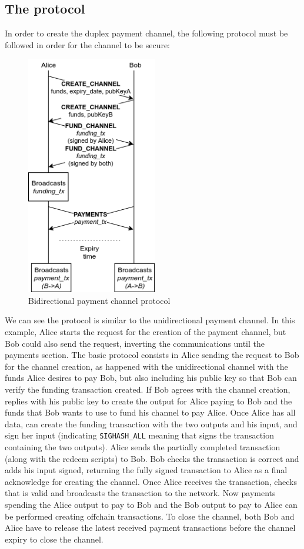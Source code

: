\documentclass[12pt,journal,compsoc]{IEEEtran}
\newcommand{\code}[1]{\texttt{#1}}
\begin{document}
\subsection{The protocol}
In order to create the duplex payment channel, the following protocol must be followed in order for the channel to be secure:
\begin{figure}[h]
    \begin{center}
        \includegraphics[height=10.5cm]{bidir-pc}
        \caption{Bidirectional payment channel protocol}
    \end{center}
\end{figure}
We can see the protocol is similar to the unidirectional payment channel. In this example, Alice starts the request for the creation of the payment channel, but Bob could also send the request, inverting the communications until the payments section. The basic protocol consists in Alice sending the request to Bob for the channel creation, as happened with the unidirectional channel with the funds Alice desires to pay Bob, but also including his public key so that Bob can verify the funding transaction created. If Bob agrees with the channel creation, replies with his public key to create the output for Alice paying to Bob and the funds that Bob wants to use to fund his channel to pay Alice. Once Alice has all data, can create the funding transaction with the two outputs and his input, and sign her input (indicating \code{SIGHASH\_ALL} meaning that signs the transaction containing the two outputs). Alice sends the partially completed transaction (along with the redeem scripts) to Bob. Bob checks the transaction is correct and adds his input signed, returning the fully signed transaction to Alice as a final acknowledge for creating the channel. Once Alice receives the transaction, checks that is valid and broadcasts the transaction to the network. Now payments spending the Alice output to pay to Bob and the Bob output to pay to Alice can be performed creating offchain transactions. To close the channel, both Bob and Alice have to release the latest received payment transactions before the channel expiry to close the channel.
\end{document}
